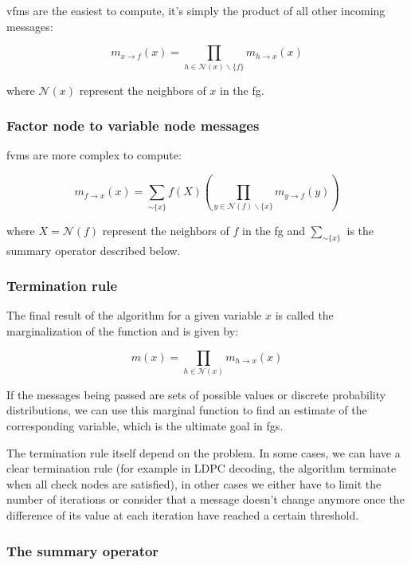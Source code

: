 \documentclass[a4paper,11pt]{report}
\newcommand{\set}[1]{\{#1\}}
\newcommand{\parens}[1]{\left( #1 \right)}
\begin{document}
\Acp{vfm} are the easiest to compute, it's simply the product of all other incoming messages:

\begin{equation}
m_{x \to f} (x) = \prod_{h\in \mathcal{N}(x)\backslash\set{f}} m_{h \to x} (x)
\end{equation}

where $\mathcal{N}(x)$ represent the neighbors of $x$ in the \ac{fg}.


\subsubsection{Factor node to variable node messages}

\Acp{fvm} are more complex to compute:

\begin{equation}
m_{f \to x} (x) = \sum_{\sim\set{x}} f(X) \parens{ \prod_{y\in \mathcal{N}(f)\backslash\set{x}} m_{y \to f} (y) }
\end{equation}

where $X=\mathcal{N}(f)$ represent the neighbors of $f$ in the \ac{fg} and $\sum_{\sim\set{x}}$ is the summary operator described below.

\subsubsection{Termination rule}

The final result of the algorithm for a given variable $x$ is called the marginalization of the function and is given by:

\begin{equation}
m(x) = \prod_{h\in\mathcal{N}(x)} m_{h\to x} (x)
\end{equation}

If the messages being passed are sets of possible values or discrete probability distributions, we can use this marginal function to find an estimate of the corresponding variable, which is the ultimate goal in \acp{fg}.

The termination rule itself depend on the problem. In some cases, we can have a clear termination rule (for example in LDPC decoding, the algorithm terminate when all check nodes are satisfied), in other cases we either have to limit the number of iterations or consider that a message doesn't change anymore once the difference of its value at each iteration have reached a certain threshold.

\subsubsection{The summary operator}
\end{document}
